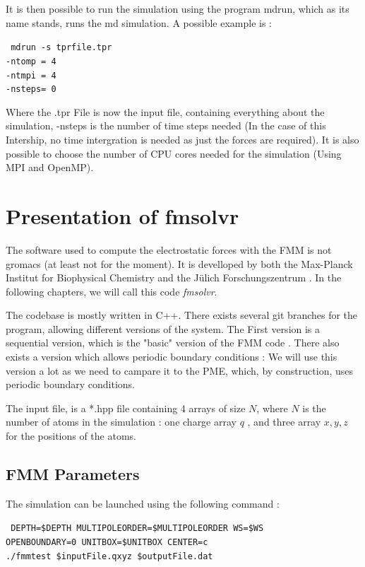 \documentclass[10pt,twoside,a4paper]{report}
\begin{document}
It is then possible to run the simulation using the program mdrun, which as its name stands, runs the md simulation. A possible example is :

{\centering\tt { mdrun -s tprfile.tpr \\
				 -ntomp = 4  			\\		
				 -ntmpi = 4				 \\
				 -nsteps= 0     		  \\  
 }}
 
\vspace{5mm}

Where the .tpr File is now the input file, containing everything about the simulation, -nsteps is the number of time steps needed (In the case of this Intership, no time intergration is needed as just the forces are required). It is also possible to choose the number of CPU cores needed for the simulation (Using MPI and OpenMP).

\section{Presentation of fmsolvr}	

	The software used to compute the electrostatic forces with the FMM is not gromacs (at least not for the moment). It is develloped by both the Max-Planck Institut for Biophysical Chemistry and the Jülich Forschungszentrum . In the following chapters, we will call this code \textit{fmsolvr}. 
	
	The codebase is mostly written in C++.  There exists several git branches for the program, allowing different versions of the system.	
The First version is a sequential version, which is the "basic" version of the FMM code . There also exists a version which allows periodic boundary conditions : We will use this version a lot as we need to campare it to the PME, which, by construction, uses periodic boundary conditions.	

The input file, is a *.hpp file containing 4 arrays of size $N$, where $N$ is the number of atoms in the simulation : one charge array $q$ , and three array $x,y,z$ for the positions of the atoms.

\subsection{FMM Parameters}

The simulation can be launched using the following command : 

{\centering\tt { DEPTH=\${DEPTH}  MULTIPOLEORDER=\${MULTIPOLEORDER}  WS=\${WS} \\ 
OPENBOUNDARY=0 UNITBOX=\${UNITBOX} CENTER=c \\
./fmmtest \$inputFile.qxyz \$outputFile.dat \\					
 }}
\end{document}
